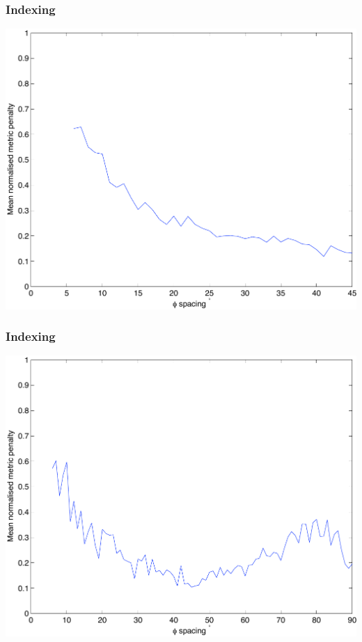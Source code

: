 \documentclass[slides,compress]{beamer}
\begin{document}
\begin{frame}
\frametitle{Indexing}
\hspace{3cm}
\includegraphics[scale=0.5]{figures/phi_spacing_45a.pdf}
\end{frame}

\begin{frame}
\frametitle{Indexing}
\hspace{3cm}
\includegraphics[scale=0.5]{figures/phi_spacing_90a.pdf}
\end{frame}
\end{document}
